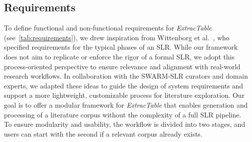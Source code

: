 \documentclass[runningheads]{llncs}
\newcommand*{\secref}[1]{\hyperref[{#1}]{\autoref*{#1}}}
\begin{document}
\subsection{Requirements}\label{sec:requirements}
To define functional and non-functional requirements for \textit{ExtracTable} (see~\secref{tab:requirements}), we drew inspiration from Wittenborg et al.~\cite{wittenborg_swarm-slr_2024}, who specified requirements for the typical phases of an SLR. While our framework does not aim to replicate or enforce the rigor of a formal SLR, we adopt this process-oriented perspective to ensure relevance and alignment with real-world research workflows. In collaboration with the SWARM-SLR curators and domain experts, we adapted these ideas to guide the design of system requirements and support a more lightweight, customizable process for literature exploration. Our goal is to offer a modular framework for \textit{ExtracTable} that enables generation and processing of a literature corpus without the complexity of a full SLR pipeline. To ensure modularity and usability, the workflow is divided into two stages, and users can start with the second if a relevant corpus already exists.
\end{document}
